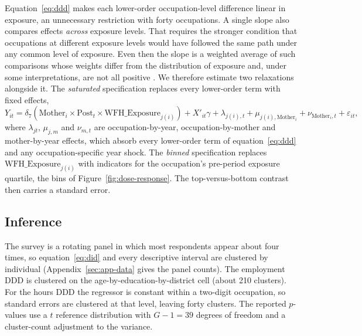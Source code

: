 \documentclass[12pt,a4paper]{article}
\newcommand{\Mother}{\text{Mother}}
\newcommand{\Post}{\text{Post}}
\newcommand{\WFH}{\text{WFH\_Exposure}}
\begin{document}
\noindent Equation~\eqref{eq:ddd} makes each lower-order occupation-level difference linear in exposure,
an unnecessary restriction with forty occupations. A single slope also compares effects
\emph{across} exposure levels. That requires the stronger condition that occupations at
different exposure levels would have followed the same path under any common level of exposure.
Even then the slope is a weighted average of such comparisons whose weights differ from the
distribution of exposure and, under some interpretations, are not all positive
\citep{callaway2024}. We therefore estimate two relaxations alongside it. The
\emph{saturated} specification replaces every lower-order term with fixed effects,
\begin{equation}\label{eq:ddd-sat}
Y_{it} = \delta_7 (\Mother_i \times \Post_t \times \WFH_{j(i)}) + X'_{it}\gamma
+ \lambda_{j(i),t} + \mu_{j(i),\Mother_i} + \nu_{\Mother_i,t} + \varepsilon_{it},
\end{equation}
where $\lambda_{jt}$, $\mu_{j,m}$ and $\nu_{m,t}$ are occupation-by-year, occupation-by-mother
and mother-by-year effects, which absorb every lower-order term of equation~\eqref{eq:ddd} and
any occupation-specific year shock. The \emph{binned} specification replaces $\WFH_{j(i)}$ with
indicators for the occupation's pre-period exposure quartile, the bins of
Figure~\ref{fig:dose-response}. The top-versus-bottom contrast then carries a standard error.

\subsection{Inference}\label{sec:inference}

The survey is a rotating panel in which most respondents appear about four times, so
equation~\eqref{eq:did} and every descriptive interval are clustered by individual
(Appendix~\ref{sec:app-data} gives the panel counts). The employment DDD is clustered on the
age-by-education-by-district cell (about 210 clusters). For the hours DDD the regressor is
constant within a two-digit occupation, so standard errors are clustered at that level, leaving
forty clusters. The reported $p$-values use a $t$ reference distribution with $G - 1 = 39$
degrees of freedom and a cluster-count adjustment to the variance.
\end{document}
